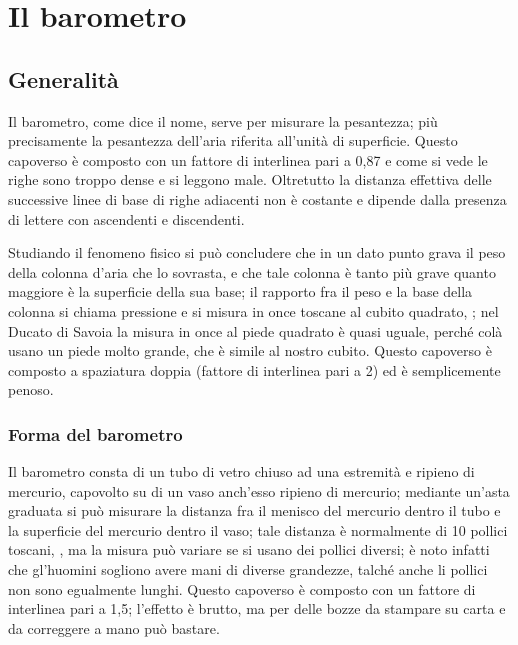 \documentclass[%
corpo=12pt,
twoside,
tipotesi=magistrale,
]{toptesi}\errorcontextlines=100
\begin{document}
\chapter{Il barometro}
\section{Generalità}
\begin{interlinea}{0.87} Il barometro, come dice il nome, serve per
misurare la pesantezza; più precisamente la pesantezza dell'aria
riferita all'unità di superficie. Questo capoverso è composto con un fattore di interlinea pari a 0,87 e come si vede le righe sono troppo dense e si leggono male. Oltretutto la distanza effettiva delle successive linee di base di righe adiacenti non è costante e dipende dalla presenza di lettere con ascendenti e discendenti.
\end{interlinea}

\begin{interlinea}{2} Studiando il fenomeno fisico si può concludere
che in un dato punto grava il peso della colonna d'aria che lo
sovrasta, e che tale colonna è tanto più grave quanto maggiore
è la superficie della sua base; il rapporto fra il peso e la base
della colonna si chiama pressione e si misura in once toscane al cubito
quadrato, \cite{tor1}; nel Ducato di Savoia la misura in once al piede
quadrato è quasi uguale, perché colà usano un piede molto
grande, che è simile al nostro cubito. Questo capoverso è composto a spaziatura doppia (fattore di interlinea pari a 2) ed è semplicemente penoso.
\end{interlinea}

\subsection{Forma del barometro}

\begin{interlinea}{1.5}
Il barometro consta di un tubo di vetro chiuso ad una estremità e
ripieno di mercurio, capovolto su di un vaso anch'esso ripieno di
mercurio; mediante un'asta graduata si può misurare la distanza fra
il menisco del mercurio dentro il tubo e la superficie del mercurio
dentro il vaso; tale distanza è normalmente di 10 pollici toscani,
\cite{tor1,tor2}, ma la misura può variare se si usano dei pollici
diversi; è noto infatti che gl'huomini sogliono avere mani di
diverse grandezze, talché anche li pollici non sono egualmente
lunghi. Questo capoverso è composto con un fattore di interlinea pari a 1,5; l'effetto è brutto, ma per delle bozze da stampare su carta e da correggere a mano può bastare.
\end{interlinea}
\end{document}
